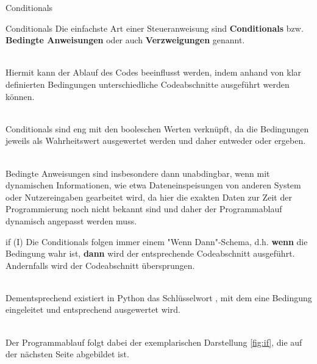     \begin{subsection}{Conditionals}
        
        \begin{frame}{Conditionals}
            Die einfachste Art einer Steueranweisung sind \textbf{Conditionals} bzw. \textbf{Bedingte Anweisungen} oder auch \textbf{Verzweigungen} genannt. \\~\
            
            Hiermit kann der Ablauf des Codes beeinflusst werden, indem anhand von klar definierten Bedingungen unterschiedliche Codeabschnitte ausgeführt werden können. \\~\
            
            Conditionals sind eng mit den booleschen Werten verknüpft, da die Bedingungen jeweils als Wahrheitswert ausgewertet werden und daher entweder  oder  ergeben. \\~\
            
            Bedingte Anweisungen sind insbesondere dann unabdingbar, wenn mit dynamischen Informationen, wie etwa Dateneinspeisungen von anderen System oder Nutzereingaben gearbeitet wird, da hier die exakten Daten zur Zeit der Programmierung noch nicht bekannt sind und daher der Programmablauf dynamisch angepasst werden muss.
            
        \end{frame}
        
        \begin{frame}{if (I)}
            Die Conditionals folgen immer einem "Wenn Dann"-Schema, d.h. \textbf{wenn} die Bedingung wahr ist, \textbf{dann} wird der entsprechende Codeabschnitt ausgeführt. Andernfalls wird der Codeabschnitt übersprungen. \\~\
            
            Dementsprechend existiert in Python das Schlüsselwort , mit dem eine Bedingung eingeleitet und entsprechend ausgewertet wird.\\~\
            
            Der Programmablauf folgt dabei der exemplarischen Darstellung \ref{fig:if}, die auf der nächsten Seite abgebildet ist.
        \end{frame}
        

\end{subsection}
